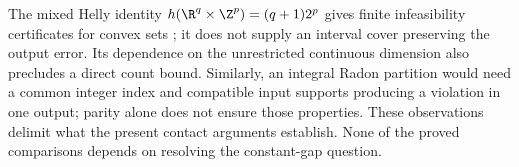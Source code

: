 The mixed Helly identity
$h(\R^q\times\Z^p)=(q+1)2^p$ gives finite infeasibility certificates
for convex sets \citep[Theorem 1.1]{averkov2012}; it does not supply an
interval cover preserving the output error. Its dependence on the
unrestricted continuous dimension also precludes a direct count bound.
Similarly, an integral Radon partition would need a common integer index
and compatible input supports producing a violation in one output;
parity alone does not ensure those properties. These observations delimit
what the present contact arguments establish. None of the proved
comparisons depends on resolving the constant-gap question.
